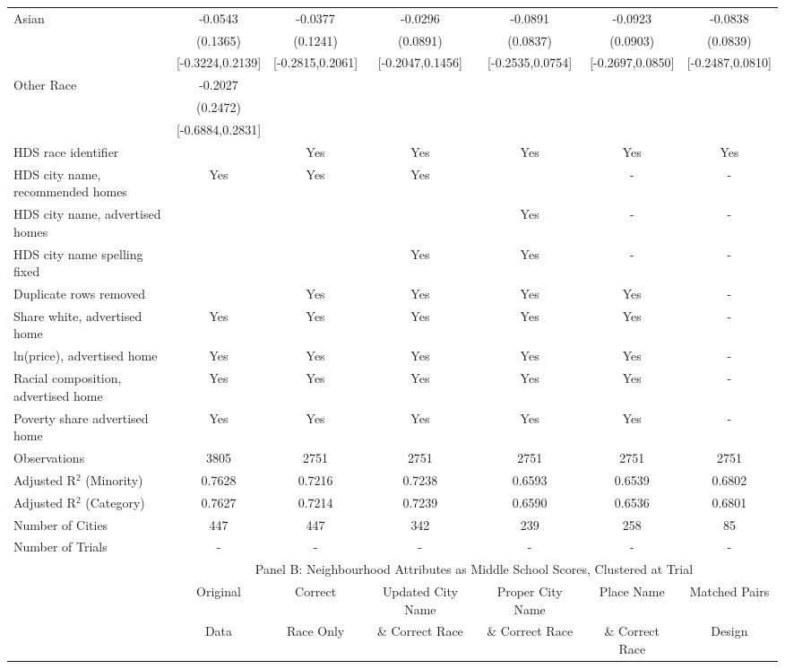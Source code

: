 \begin{table}[htbp]
{\begin{tabular}{l*{6}{c}}
Asian & -0.0543 & -0.0377 & -0.0296 & -0.0891 & -0.0923 & -0.0838 \\
 & (0.1365) & (0.1241) & (0.0891) & (0.0837) & (0.0903) & (0.0839) \\
 & [-0.3224,0.2139] & [-0.2815,0.2061] & [-0.2047,0.1456] & [-0.2535,0.0754] & [-0.2697,0.0850] & [-0.2487,0.0810] \\
Other Race & -0.2027 &  &  &  &  &  \\
 & (0.2472) &  &  &  &  &  \\
 & [-0.6884,0.2831] &  &  &  &  &  \\
\midrule
HDS race identifier & & Yes & Yes & Yes & Yes & Yes \\
HDS city name, recommended homes & Yes & Yes & Yes & & - & -\\
HDS city name, advertised homes &  &  &  & Yes & - & -\\
HDS city name spelling fixed & & & Yes & Yes & - & -\\
Duplicate rows removed &  & Yes & Yes & Yes & Yes & - \\
\midrule
Share white, advertised home  & Yes & Yes & Yes & Yes & Yes & - \\
ln(price), advertised home  & Yes & Yes & Yes & Yes & Yes & - \\
Racial composition, advertised home & Yes & Yes & Yes & Yes & Yes & - \\
Poverty share advertised home & Yes & Yes & Yes & Yes & Yes & - \\
Observations & 3805 & 2751 & 2751 & 2751 & 2751 & 2751 \\
Adjusted R$^2$ (Minority) & 0.7628 & 0.7216 & 0.7238 & 0.6593 & 0.6539 & 0.6802 \\
Adjusted R$^2$ (Category) & 0.7627 & 0.7214 & 0.7239 & 0.6590 & 0.6536 & 0.6801 \\
Number of Cities & 447 & 447 & 342 & 239 & 258 & 85 \\
Number of Trials & - & - & - & - & - & - \\
\bottomrule
\toprule
& \multicolumn{6}{c}{Panel B: Neighbourhood Attributes as Middle School Scores, Clustered at Trial}\\
\toprule
                    &\multicolumn{1}{c}{Original}&\multicolumn{1}{c}{Correct}&\multicolumn{1}{c}{Updated City Name}&\multicolumn{1}{c}{Proper City Name}&\multicolumn{1}{c}{Place Name}&\multicolumn{1}{c}{Matched Pairs}\\
                      &\multicolumn{1}{c}{Data}&\multicolumn{1}{c}{Race Only}&\multicolumn{1}{c}{\& Correct Race}&\multicolumn{1}{c}{\& Correct Race}&\multicolumn{1}{c}{\& Correct Race}&\multicolumn{1}{c}{Design}\\                  

\end{tabular}}
\end{table}
